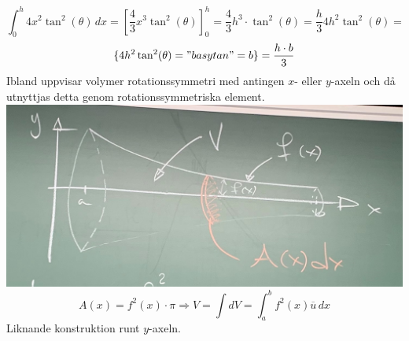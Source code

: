 \begin{equation*}
    \int_0^h 4x^2\tan^2(\theta)\, dx=
        [\frac{4}{3}x^3\tan^2(\theta)]_0^h=
    \frac{4}{3}h^3\cdot\tan^2(\theta)=
    \frac{h}{3}4h^2\tan^2(\theta)=
\end{equation*}
\begin{equation*}
    \{4h^2\tan^2(\theta)="basytan"=b\}=
    \frac{h\cdot b}{3}
\end{equation*}
Ibland uppvisar volymer rotationssymmetri med antingen $x$- eller $y$-axeln och då utnyttjas detta genom rotationssymmetriska element.
\includegraphics[scale=0.1]{lessons/lesson19/imgs/img05.jpg}
\begin{equation*}
    A(x)=f^2(x)\cdot\pi\Rightarrow
    V=\int dV=\int_a^bf^2(x)\overline{u}\, dx
\end{equation*}
Liknande konstruktion runt $y$-axeln.

